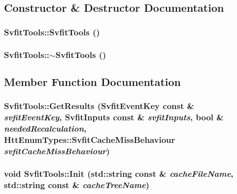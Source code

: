 \subsection{Constructor \& Destructor Documentation}
\hypertarget{classSvfitTools_a3ee4e5c67da74ca1da44be0be5e23105}{
\subsubsection[{SvfitTools}]{\setlength{\rightskip}{0pt plus 5cm}SvfitTools::SvfitTools ()}}
\label{classSvfitTools_a3ee4e5c67da74ca1da44be0be5e23105}
\hypertarget{classSvfitTools_a946db8077e348912ac31945c749efbb0}{
\subsubsection[{$\sim$SvfitTools}]{\setlength{\rightskip}{0pt plus 5cm}SvfitTools::$\sim$SvfitTools ()}}
\label{classSvfitTools_a946db8077e348912ac31945c749efbb0}


\subsection{Member Function Documentation}
\hypertarget{classSvfitTools_a131289c85e27ee4e9020019ec739c86f}{
\subsubsection[{GetResults}]{ SvfitTools::GetResults ({\bf SvfitEventKey} const \& {\em svfitEventKey}, \/  {\bf SvfitInputs} const \& {\em svfitInputs}, \/  bool \& {\em neededRecalculation}, \/  {\bf HttEnumTypes::SvfitCacheMissBehaviour} {\em svfitCacheMissBehaviour})}}
\label{classSvfitTools_a131289c85e27ee4e9020019ec739c86f}
\hypertarget{classSvfitTools_ab20f7b07a94189526b22b6d8dd8ecfb4}{
\subsubsection[{Init}]{\setlength{\rightskip}{0pt plus 5cm}void SvfitTools::Init (std::string const \& {\em cacheFileName}, \/  std::string const \& {\em cacheTreeName})}}
\label{classSvfitTools_ab20f7b07a94189526b22b6d8dd8ecfb4}


